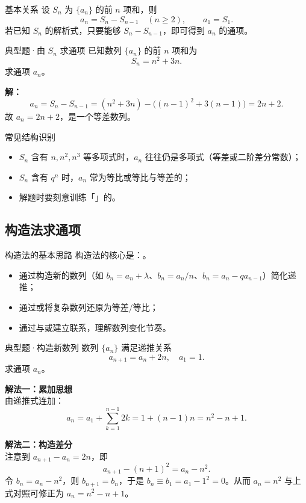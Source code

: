 \documentclass[a4paper,11pt]{ctexart}
\begin{document}
\begin{definitionbox}{基本关系}
  设 $S_n$ 为 $\{a_n\}$ 的前 $n$ 项和，则
  \[
    a_n = S_n - S_{n-1}\quad(n\ge2),\qquad a_1=S_1.
  \]
  若已知 $S_n$ 的解析式，只要能够 $S_n-S_{n-1}$，即可得到 $a_n$ 的通项。
\end{definitionbox}

\begin{examplebox}{典型题·由 $S_n$ 求通项}
  已知数列 $\{a_n\}$ 的前 $n$ 项和为
  \[
    S_n = n^2+3n.
  \]
  求通项 $a_n$。

  \textbf{解：}
  \[
    a_n = S_n - S_{n-1} = (n^2+3n)-\bigl((n-1)^2+3(n-1)\bigr) = 2n+2.
  \]
  故 $a_n=2n+2$，是一个等差数列。
\end{examplebox}

\begin{sideinfobox}{常见结构识别}
  \begin{itemize}
    \item $S_n$ 含有 $n,n^2,n^3$ 等多项式时，$a_n$ 往往仍是多项式（等差或二阶差分常数）；
    \item $S_n$ 含有 $q^n$ 时，$a_n$ 常为等比或等比与等差的；
    \item 解题时要刻意训练「」的。
  \end{itemize}
\end{sideinfobox}

\subsection{构造法求通项}

\begin{definitionbox}{构造法的基本思路}
  构造法的核心是：。
  \begin{itemize}
    \item 通过构造新的数列（如 $b_n=a_n+\lambda$、$b_n=a_n/n$、$b_n=a_n-q a_{n-1}$）简化递推；
    \item 通过或将复杂数列还原为等差/等比；
    \item 通过与或建立联系，理解数列变化节奏。
  \end{itemize}
\end{definitionbox}

\begin{examplebox}{典型题·构造新数列}
  数列 $\{a_n\}$ 满足递推关系
  \[
    a_{n+1}=a_n+2n,\quad a_1=1.
  \]
  求通项 $a_n$。

  \textbf{解法一：累加思想}\\
  由递推式连加：
  \[
    a_n = a_1+\sum_{k=1}^{n-1}2k = 1 + (n-1)n = n^2-n+1.
  \]

  \textbf{解法二：构造差分}\\
  注意到 $a_{n+1}-a_n=2n$，即
  \[
    a_{n+1}-(n+1)^2 = a_n-n^2.
  \]
  令 $b_n=a_n-n^2$，则 $b_{n+1}=b_n$，于是 $b_n\equiv b_1=a_1-1^2=0$。从而 $a_n=n^2$ 与上式对照可修正为 $a_n=n^2-n+1$。
\end{examplebox}
\end{document}
